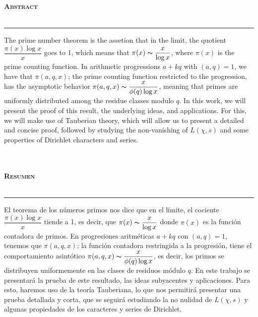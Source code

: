 
\thispagestyle{empty}
\vspace*{4cm}
\begin{Huge}
    \bfseries \selectfont \hfill \scshape Abstract\\\\
    \rule[0.5ex]{\linewidth}{1pt}
\end{Huge}

The prime number theorem is the assetion that in the limit, the quotient $\dfrac{\pi(x)\log x}{x}$ goes to 1, which means that $\pi(x)\thicksim \dfrac{x}{\log x}$, where $\pi(x)$ is the prime counting function. In arithmetic progressions $a+kq$ with $(a,q)=1$, we have that $\pi(a,q,x)$; the prime counting function restricted to the progression, has the asymptotic behavior $\pi(a,q,x)\thicksim \dfrac{x}{\phi(q)\log x}$, meaning that primes are uniformly distributed among the residue classes modulo $q$. In this work, we will present the proof of this result, the underlying ideas, and applications. For this, we will make use of Tauberian theory, which will allow us to present a detailed and concise proof, followed by studying the non-vanishing of $L(\chi,s)$ and some properties of Dirichlet characters and series.\\\\\\

\begin{Huge}
    \bfseries \selectfont \scshape Resumen\\\\
    \rule[0.5ex]{\linewidth}{1pt}
\end{Huge}

El teorema de los números primos nos dice que en el límite, el cociente $\dfrac{\pi(x)\log x}{x}$ tiende a 1, es decir, que $\pi(x)\thicksim \dfrac{x}{\log x}$ donde $\pi(x)$ es la función contadora de primos. En progresiones aritméticas $a+kq$ con $(a,q)=1$, tenemos que $\pi(a,q,x)$; la función contadora restringida a la progresión, tiene el comportamiento asintótico $\pi(a,q,x)\thicksim \dfrac{x}{\phi(q)\log x}$, es decir, los primos se distribuyen uniformemente en las clases de residuos módulo $q$. En este trabajo se presentará la prueba de este resultado, las ideas subyacentes y aplicaciones. Para esto, haremos uso de la teoría Tauberiana, lo que nos permitirá presentar una prueba detallada y corta, que se seguirá estudiando la no nulidad de $L(\chi,s)$ y algunas propiedades de los caracteres y series de Dirichlet.